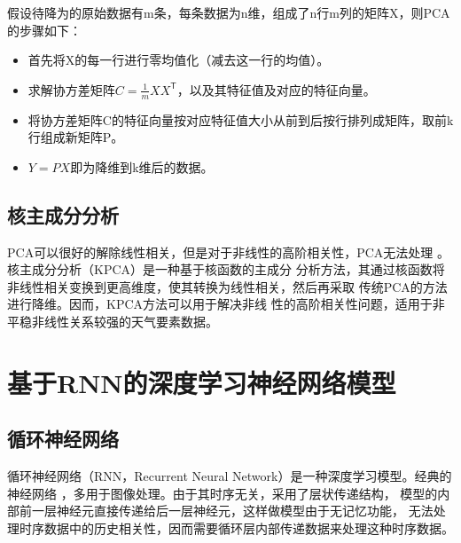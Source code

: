 \documentclass[AutoFakeBold]{LZUThesis}
\begin{document}
假设待降为的原始数据有m条，每条数据为n维，组成了n行m列的矩阵X，则PCA的步骤如下：

\begin{itemize}
    \item 首先将X的每一行进行零均值化（减去这一行的均值）。
    \item 求解协方差矩阵$C=\frac{1}{m}XX^\mathsf{T}$，以及其特征值及对应的特征向量。
    \item 将协方差矩阵C的特征向量按对应特征值大小从前到后按行排列成矩阵，取前k行组成新矩阵P。
    \item $Y=PX$即为降维到k维后的数据。
\end{itemize}

\subsection{核主成分分析}
PCA可以很好的解除线性相关，但是对于非线性的高阶相关性，PCA无法处理
\cite{jolliffe2016principal}。核主成分分析（KPCA）是一种基于核函数的主成分
分析方法，其通过核函数将非线性相关变换到更高维度，使其转换为线性相关，然后再采取
传统PCA的方法进行降维。因而，KPCA方法可以用于解决非线
性的高阶相关性问题，适用于非平稳非线性关系较强的天气要素数据。

\section{基于RNN的深度学习神经网络模型}
\subsection{循环神经网络}
循环神经网络（RNN，Recurrent Neural Network）是一种深度学习模型。经典的神经网络
\cite{rumelhart1986learning}，多用于图像处理。由于其时序无关，采用了层状传递结构，
模型的内部前一层神经元直接传递给后一层神经元，这样做模型由于无记忆功能，
无法处理时序数据中的历史相关性，因而需要循环层内部传递数据来处理这种时序数据。
\end{document}
